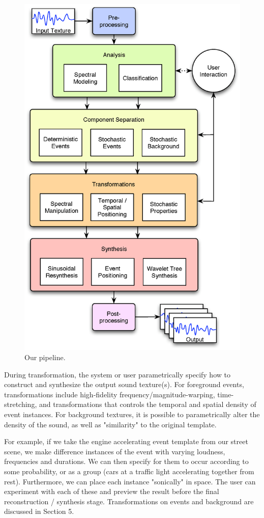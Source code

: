 \documentclass{acmsiggraph}               %
\begin{document}
\begin{figure}[h]
\centering
\includegraphics[width=.95\columnwidth]{ourpipeline.eps}
\caption{Our pipeline.}
\end{figure}

During transformation, the system or user parametrically specify how to 
construct and synthesize the output sound texture(s).  For foreground
events, transformations include high-fidelity frequency/magnitude-warping, 
time-stretching, and transformations that controls the temporal and spatial 
density of event instances.  For background textures, it is possible to parametrically
alter the density of the sound, as well as "similarity" to the original template.

For example, if we take the engine accelerating event template from our 
street scene, we make difference instances of the event with varying 
loudness, frequencies and durations.  We can then specify for them to occur 
according to some probability, or as a group (cars at a traffic light 
accelerating together from rest).  Furthermore, we can place each instance
"sonically" in space.  The user can experiment with each of these and 
preview the result before the final reconstruction / synthesis stage.  Transformations
on events and background are discussed in Section 5.
\end{document}
